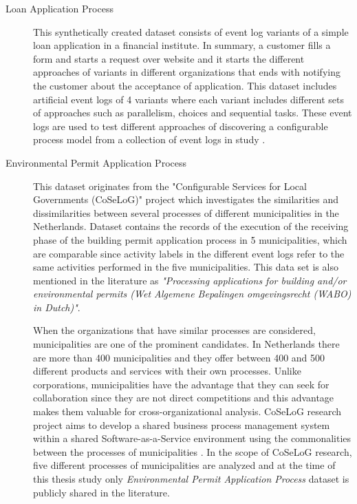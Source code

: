 \begin{description}
  \item[Loan Application Process \cite{loan-app-data}] This synthetically created dataset consists of event log variants of a simple loan application in a financial institute. In summary, a customer fills a form and starts a request over website and it starts the different approaches of variants in different organizations that ends with notifying the customer about the acceptance of application. This dataset includes artificial event logs of 4 variants where each variant includes different sets of approaches such as parallelism, choices and sequential tasks. These event logs are used to test different approaches of discovering a configurable process model from a collection of event logs in study \cite{buijs2014flexible}.
  \item[Environmental Permit Application Process \cite{coselog-data}] This dataset originates from the "Configurable Services for Local Governments (CoSeLoG)" project \cite{van2011business} which investigates the similarities and dissimilarities between several processes of different municipalities in the Netherlands.  Dataset contains the records of the execution of the receiving phase of the building permit application process in 5 municipalities, which are comparable since activity labels in the different event logs refer to the same activities performed in the five municipalities. This data set is also mentioned in the literature as \textit{"Processing applications for building and/or environmental permits (Wet Algemene Bepalingen omgevingsrecht (WABO) in Dutch)"}.

  When the organizations that have similar processes are considered, municipalities are one of the prominent candidates. In Netherlands there are more than 400 municipalities and they offer between 400 and 500 different products and services with their own processes. Unlike corporations, municipalities have the advantage that they can seek for collaboration since they are not direct competitions \cite{buijs2012towards} and this advantage makes them valuable for cross-organizational analysis. CoSeLoG research project aims to develop a shared business process management system within a shared Software-as-a-Service environment using the commonalities between the processes of municipalities \cite{buijs2014flexible}. In the scope of CoSeLoG research, five different processes of municipalities are analyzed and at the time of this thesis study only \textit{Environmental Permit Application Process} dataset is publicly shared in the literature.
\end{description}

